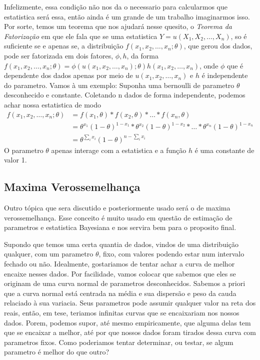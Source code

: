 Infelizmente, essa condição não nos da o necessario para calcularmos que estatistica será essa,
então ainda é um grande de um trabalho imaginarmos isso. Por sorte, temos um teorema que nos ajudará
nesse quesito, o \textit{Teorema da Fatorização} em que ele fala que se uma estatistica
\(Y=u(X_1,X_2,\ldots ,X_n)\), so é suficiente se e apenas se, a distribuição
\(f(x_1,x_2,\ldots,x_n;\theta )\), que gerou dos dados, pode ser fatorizada em dois fatores,
\(\phi,h \), da forma \(f(x_1,x_2,\ldots,x_n;\theta )=\phi
(u(x_1,x_2,\ldots,x_n);\theta)h(x_1,x_2,\ldots,x_n)\), onde \(\phi\) que é dependente dos dados
apenas por meio de \(u(x_1,x_2,\ldots,x_n)\) e \(h\) é independente do parametro. Vamos à um
exemplo:
Suponha uma bernoulli de parametro \(\theta \) desconhecido e constante. Coletando n dados de forma
independente, podemos achar nossa estatistica de modo
\begin{align*}
    f(x_1,x_2,\ldots ,x_n;\theta)&=f(x_1,\theta)*f(x_2,\theta)*\ldots*f(x_n,\theta)\\
    &=\theta^{x_1}(1-\theta)^{1-x_1}*\theta^{x_2}(1-\theta)^{1-x_2}*\ldots*\theta^{x_n}(1-\theta)^{1-x_n}\\
    &=\theta^{\sum_{i} x_i}(1-\theta)^{n-\sum_{i}x_i} 
\end{align*}
O parametro \(\theta \) apenas interage com a estatistica e a função \(h\) é uma constante de valor 1.
\subsection{Maxima Verossemelhança}
Outro tópica que sera discutido e posteriormente usado será o de maxima verossemelhança. Esse
conceito é muito usado em questão de estimação de parametros e estatistica Bayesiana e nos servira
bem para o proposito final. \par

Supondo que temos uma certa quantia de dados, vindos de uma distribuição qualquer, com um parametro
\(\theta \), fixo, com valores podendo estar num intervalo fechado ou não. Idealmente, gostariamos de
tentar achar a curva de melhor encaixe nesses dados. Por facilidade, vamos colocar que sabemos que
eles se originam de uma curva normal de parametros desconhecidos. Sabemos a priori que a curva
normal está centrada na média e sua dispersão e peso da cauda relaciado à sua variacia. Seus
parametros pode assumir qualquer valor na reta dos reais, então, em tese, teriamos infinitas curvas
que se encaixariam nos nossos dados. Porem, podemos supor, até mesmo empiricamente, que alguma delas
tem que se encaixar a melhor, até por que nossos dados foram tirados dessa curva com parametros
fixos. Como poderiamos tentar determinar, ou testar, se algum parametro é melhor do que outro? \par

